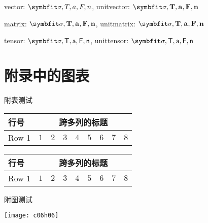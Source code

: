 vector: $\Vector{\sigma, T, a, F, n}$, unitvector: $\unitVector{\sigma, T, a, F, n}$

matrix: $\Matrix{\sigma, T, a, F, n}$, unitmatrix: $\unitMatrix{\sigma, T, a, F, n}$

tensor: $\Tensor{\sigma, T, a, F, n}$, unittensor: $\unitTensor{\sigma, T, a, F, n}$ 


\chapter{附录中的图表}

附表测试

\begin{apptab}[htbp]
    \label{apptab:1}
    \centering
    \begin{tabular}{lcccccccc}
        \hline
        行号 & \multicolumn{8}{c}{跨多列的标题}\\
        \hline
        Row 1 & $1$ & $2$ & $3$ & $4$ & $5$ & $6$ & $7$ & $8$\\
        \hline
    \end{tabular}
\end{apptab}


\begin{apptab}[htbp]
    \label{apptab:2}
    \centering
    \begin{tabular}{lcccccccc}
        \hline
        行号 & \multicolumn{8}{c}{跨多列的标题}\\
        \hline
        Row 1 & $1$ & $2$ & $3$ & $4$ & $5$ & $6$ & $7$ & $8$\\
        \hline
    \end{tabular}
\end{apptab}

附图测试

\begin{appfig}[htbp]
    \centering
    \texttt{[image: c06h06]}
    \label{appfig:1}
\end{appfig}


